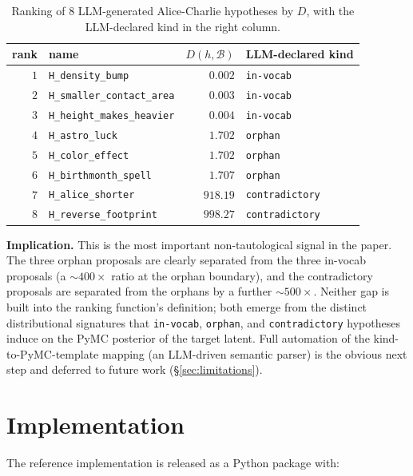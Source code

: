 \documentclass{article}
\begin{document}
\begin{table}[h]
\centering
\caption{Ranking of $8$ LLM-generated Alice-Charlie hypotheses by $D$,
with the LLM-declared kind in the right column.}
\label{tab:llm-gen}
\small
\begin{tabular}{rlrl}
\toprule
rank & name                     & $D(h, \mathcal{B})$ & LLM-declared kind \\
\midrule
$1$  & \texttt{H\_density\_bump}         & $0.002$   & \texttt{in-vocab} \\
$2$  & \texttt{H\_smaller\_contact\_area}& $0.003$   & \texttt{in-vocab} \\
$3$  & \texttt{H\_height\_makes\_heavier}& $0.004$   & \texttt{in-vocab} \\
$4$  & \texttt{H\_astro\_luck}           & $1.702$   & \texttt{orphan} \\
$5$  & \texttt{H\_color\_effect}         & $1.702$   & \texttt{orphan} \\
$6$  & \texttt{H\_birthmonth\_spell}     & $1.707$   & \texttt{orphan} \\
$7$  & \texttt{H\_alice\_shorter}        & $918.19$  & \texttt{contradictory} \\
$8$  & \texttt{H\_reverse\_footprint}    & $998.27$  & \texttt{contradictory} \\
\bottomrule
\end{tabular}
\end{table}

\textbf{Implication.} This is the most important non-tautological
signal in the paper. The three orphan proposals are clearly separated
from the three in-vocab proposals (a $\sim 400\times$ ratio at the
orphan boundary), and the contradictory proposals are separated from
the orphans by a further $\sim 500\times$. Neither gap is built into
the ranking function's definition; both emerge from the distinct
distributional signatures that \texttt{in-vocab}, \texttt{orphan}, and
\texttt{contradictory} hypotheses induce on the PyMC posterior of the
target latent. Full automation of the kind-to-PyMC-template mapping
(an LLM-driven semantic parser) is the obvious next step and
deferred to future work (\S\ref{sec:limitations}).

\section{Implementation}
\label{sec:impl}

The reference implementation is released as a Python package with:
\end{document}
